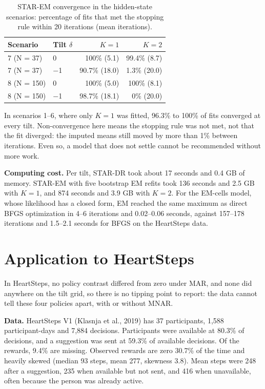 \documentclass[12pt]{article}
\begin{document}
\begin{table}[!htbp]\centering\small
\caption{STAR-EM convergence in the hidden-state scenarios: percentage of fits that met the stopping rule within 20 iterations (mean iterations).}
\begin{tabular}{llrr}
\toprule
\textbf{Scenario} & \textbf{Tilt $\delta$} & \textbf{$K=1$} & \textbf{$K=2$} \\
\midrule
7 (N = 37) & 0 & 100\% (5.1) & 99.4\% (8.7) \\
7 (N = 37) & $-$1 & 90.7\% (18.0) & 1.3\% (20.0) \\
8 (N = 150) & 0 & 100\% (5.0) & 100\% (8.1) \\
8 (N = 150) & $-$1 & 98.7\% (18.1) & 0\% (20.0) \\
\bottomrule
\end{tabular}
\end{table}

In scenarios 1--6, where only $K=1$ was fitted, 96.3\% to 100\% of fits converged at every tilt. Non-convergence here means the stopping rule was not met, not that the fit diverged: the imputed means still moved by more than 1\% between iterations. Even so, a model that does not settle cannot be recommended without more work.

\textbf{Computing cost.} Per tilt, STAR-DR took about 17 seconds and 0.4 GB of memory. STAR-EM with five bootstrap EM refits took 136 seconds and 2.5 GB with $K=1$, and 874 seconds and 3.9 GB with $K=2$. For the EM-cells model, whose likelihood has a closed form, EM reached the same maximum as direct BFGS optimization in 4--6 iterations and 0.02--0.06 seconds, against 157--178 iterations and 1.5--2.1 seconds for BFGS on the HeartSteps data.

\section{Application to HeartSteps}

In HeartSteps, no policy contrast differed from zero under MAR, and none did anywhere on the tilt grid, so there is no tipping point to report: the data cannot tell these four policies apart, with or without MNAR.

\textbf{Data.} HeartSteps V1 (Klasnja et al., 2019) has 37 participants, 1,588 participant-days and 7,884 decisions. Participants were available at 80.3\% of decisions, and a suggestion was sent at 59.3\% of available decisions. Of the rewards, 9.4\% are missing. Observed rewards are zero 30.7\% of the time and heavily skewed (median 93 steps, mean 277, skewness 3.8). Mean steps were 248 after a suggestion, 235 when available but not sent, and 416 when unavailable, often because the person was already active.
\end{document}
